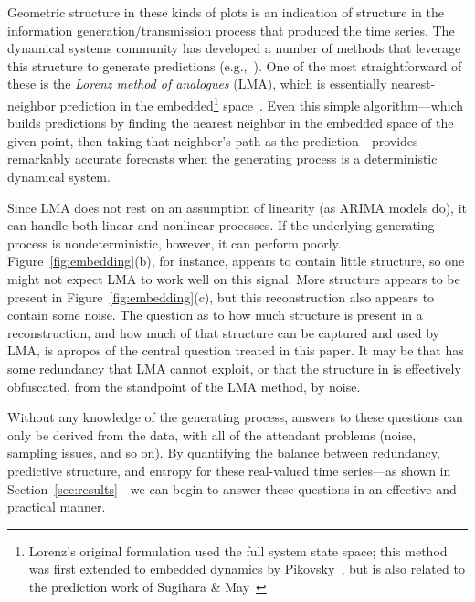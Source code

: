 Geometric structure in these kinds of plots is an indication of
structure in the information generation/transmission process that
produced the time series.  The dynamical systems community has
developed a number of methods that leverage this structure to generate
predictions (e.g.,~\cite{weigend-book,casdagli-eubank92,Smith199250}).
One of the most straightforward of these is the \emph{Lorenz method of
  analogues} (LMA), which is essentially nearest-neighbor prediction
in the embedded\footnote{Lorenz's original formulation used the full
  system state space;
%
%
this method was first extended to embedded dynamics by
Pikovsky~\cite{pikovsky86-sov}, but is also related to the prediction
work of Sugihara \& May~\cite{sugihara90}}
space~\cite{lorenz-analogues}.  Even this simple algorithm---which
builds predictions by finding the nearest neighbor in the embedded
space of the given point, then taking that neighbor's path as the
prediction---provides remarkably accurate forecasts when the
generating process is a deterministic dynamical system.

Since LMA does not rest on an assumption of linearity (as ARIMA models
do), it can handle both linear and nonlinear processes.  If the
underlying generating process is nondeterministic, however, it can
perform poorly.  Figure~\ref{fig:embedding}(b), for instance, appears
to contain little structure, so one might not expect LMA to work well
on this signal.  More structure appears to be present in
Figure~\ref{fig:embedding}(c), but this reconstruction also appears to
contain some noise.  The question as to how much structure is present
in a reconstruction, and how much of that structure can be captured
and used by LMA, is apropos of the central question treated in this
paper.  It may be that \gcc has some redundancy that LMA cannot
exploit, or that the structure in \svdfive is effectively obfuscated,
from the standpoint of the LMA method, by noise.  

Without any knowledge of the generating process, answers to these
questions can only be derived from the data, with all of the attendant
problems (noise, sampling issues, and so on).  By quantifying the
balance between redundancy, predictive structure, and entropy for
these real-valued time series---as shown in
Section~\ref{sec:results}---we can begin to answer these questions in
an effective and practical manner.



